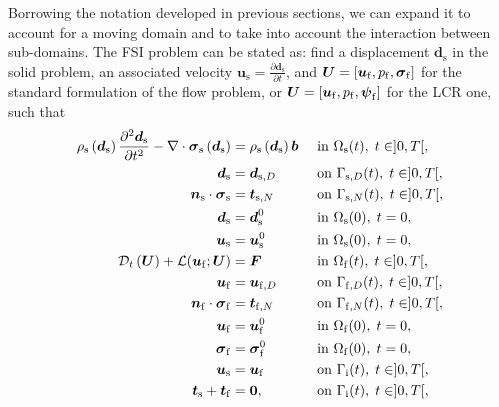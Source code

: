 \documentclass[11pt,english]{article}
\def\ufluid{\boldsymbol{u}_{\rm{f}}}
\def\ufluidD{\boldsymbol{u}_{{\rm{f}},D}}
\def\usolid{\boldsymbol{u}_{\rm{s}}}
\def\sigmafluid{\boldsymbol{\sigma}_{\rm{f}}}
\def\pfluid{p_{\rm{f}}}
\def\psifluid{\boldsymbol{\psi}_{\rm{f}}}
\def\boundaryinterface{\Gamma_{\rm{i}}}
\begin{document}
Borrowing the notation developed in previous sections, we can expand it to account for a moving domain and to take into account the interaction between sub-domains. The FSI problem can be stated as: find a displacement $\boldsymbol{d}_{\mathrm{s}}$ in the solid problem, an associated velocity $\boldsymbol{u}_{\mathrm{s}} = \frac{\partial\boldsymbol{d}_{\mathrm{s}}}{\partial t}$,  and $\boldsymbol{U}=[\ufluid,\pfluid,\sigmafluid]$ for the standard formulation of the flow problem, or $\boldsymbol{U}=[\ufluid,\pfluid,\psifluid]$ for the LCR one, such that
\begin{align*}
    \rho_\mathrm{s}\left(\boldsymbol{d}_{\mathrm{s}}\right)\frac{\partial^{2}\boldsymbol{d}_{\mathrm{s}}}{\partial t^2} -\nabla \cdot \boldsymbol{\sigma}_{\mathrm{s}}\left(\boldsymbol{d}_{\mathrm{s}}\right) &= \rho_{\mathrm{s}}\left(\boldsymbol{d}_{\mathrm{s}}\right) \boldsymbol{b} && \text{ in } \ensuremath{\Omega}_{\rm{s}}(t), \; t\in]0,T[, \\ %
    \boldsymbol{d}_{\mathrm{s}} &= \boldsymbol{d}_{\mathrm{s},D}  &&\text{ on } \Gamma_{\mathrm{s},D}(t), \; t\in]0,T[, \nonumber\\
    \boldsymbol{n}_\mathrm{s}\cdot\boldsymbol{\sigma}_\mathrm{s} &= \boldsymbol{t}_{\mathrm{s},N}  &&\text{ on } \Gamma_{\mathrm{s},N}(t), \; t\in]0,T[, \\ %
    \boldsymbol{d}_{\mathrm{s}} &= \boldsymbol{d}_{\mathrm{s}}^0 &&\text{ in } \ensuremath{\Omega}_{\rm{s}}(0), \; t=0, \nonumber \\
    \boldsymbol{u}_{\mathrm{s}} &= \boldsymbol{u}_{\mathrm{s}}^0&&\text{ in } \ensuremath{\Omega}_{\rm{s}}(0), \; t=0, \\ 
    \mathcal{\mathcal{D}}_{t}\left(\boldsymbol{U}\right)+\mathcal{L}(\ufluid;\boldsymbol{U}) &= \boldsymbol{F} &&\text{ in } \ensuremath{\Omega}_{\rm{f}}(t), \; t\in]0,T[, \\ %
    \ufluid&=\ufluidD  &&\text{ on }  \Gamma_{{\rm{f}},D}(t), \; t \in]0,T[,\nonumber \\
    \boldsymbol{n}_{\rm{f}}\cdot\sigmafluid&=\boldsymbol{t}_{{\rm{f}},N}  &&\text{ on }  \Gamma_{{\rm{f}},N}(t),  \; t \in]0,T[, \nonumber\\
    \ufluid&=\ufluid^0  &&\text{ in }  \Omega_{\rm{f}}(0), \; t=0, \\ %
    \sigmafluid&=\boldsymbol{\sigma}_{\rm{f}}^0  &&\text{ in }  \Omega_{\rm{f}}(0), \; t=0,  \\ %
    \usolid &= \ufluid  &&\text{ on } \boundaryinterface(t), \; t \in]0,T[, \\ 
    \boldsymbol{t}_{\mathrm{s}} + \boldsymbol{t}_{\mathrm{f}}  & = {\bf 0},
    &&\text{ on } \boundaryinterface(t), \; t\in]0,T[,  %
 \end{align*}
\end{document}
